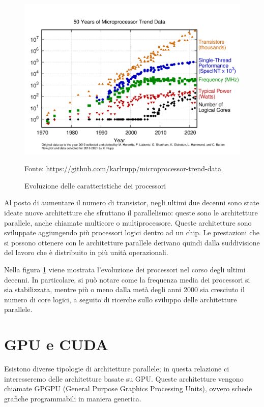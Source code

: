 \documentclass[12pt,a4paper,openright,twoside]{report}
\newcommand{\source}[1]{\caption*{\hfill \scriptsize Fonte: {#1}} }
\begin{document}
\begin{figure}[h]
    \centering
    \includegraphics[width=\textwidth]{50-years-processor-trend.png}
    \source{\url{https://github.com/karlrupp/microprocessor-trend-data}}
    \caption{Evoluzione delle caratteristiche dei processori}
    \label{img:trend_proc}
\end{figure}

Al posto di aumentare il numero di transistor, negli ultimi due decenni sono state ideate nuove architetture che sfruttano il parallelismo: queste sono le architetture parallele, anche chiamate multicore o multiprocessore. Queste architetture sono sviluppate aggiungendo più processori logici dentro ad un chip. Le prestazioni che si possono ottenere con le architetture parallele derivano quindi dalla suddivisione del lavoro che è distribuito in più unità operazionali.

Nella figura \ref{img:trend_proc} viene mostrata l'evoluzione dei processori nel corso degli ultimi decenni. In particolare, si può notare come la frequenza media dei processori si sia stabilizzata, mentre più o meno dalla metà degli anni 2000 sia cresciuto il numero di core logici, a seguito di ricerche sullo sviluppo delle architetture parallele.

\section{GPU e CUDA}

Esistono diverse tipologie di architetture parallele; in questa relazione ci interesseremo delle architetture basate su GPU. Queste architetture vengono chiamate GPGPU (General Purpose Graphics Processing Units), ovvero schede grafiche programmabili in maniera generica.
\end{document}

